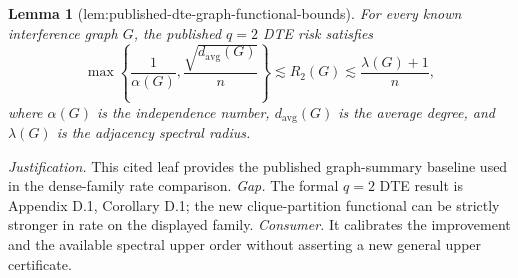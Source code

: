 \documentclass{article}
\newtheorem{lemma}{Lemma}
\begin{document}
\begin{lemma}[lem:published-dte-graph-functional-bounds]\label{lem:published-dte-graph-functional-bounds}
For every known interference graph \(G\), the published \(q=2\) DTE risk satisfies
\[
\max\left\{\frac1{\alpha(G)},\frac{\sqrt{d_{\mathrm{avg}}(G)}}n\right\}
\lesssim R_2(G)
\lesssim\frac{\lambda(G)+1}{n},
\]
where \(\alpha(G)\) is the independence number, \(d_{\mathrm{avg}}(G)\) is the average degree, and \(\lambda(G)\) is the adjacency spectral radius.
\end{lemma}
\par\smallskip\noindent \textit{Justification.} This cited leaf provides the published graph-summary baseline used in the dense-family rate comparison. \textit{Gap.} The formal \(q=2\) DTE result is Appendix D.1, Corollary D.1; the new clique-partition functional can be strictly stronger in rate on the displayed family. \textit{Consumer.} It calibrates the improvement and the available spectral upper order without asserting a new general upper certificate.
\end{document}
